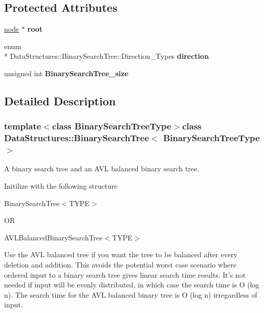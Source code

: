 \subsection*{Protected Attributes}
\begin{DoxyCompactItemize}
\item 
\hypertarget{class_data_structures_1_1_binary_search_tree_a6854050657cfa61442e6189dd0039318}{\hyperlink{struct_data_structures_1_1_binary_search_tree_1_1node}{node} $\ast$ {\bfseries root}}\label{class_data_structures_1_1_binary_search_tree_a6854050657cfa61442e6189dd0039318}

\item 
\hypertarget{class_data_structures_1_1_binary_search_tree_a292e62e2b24b59d393657ff3c69c82ed}{enum \\*
Data\-Structures\-::\-Binary\-Search\-Tree\-::\-Direction\-\_\-\-Types {\bfseries direction}}\label{class_data_structures_1_1_binary_search_tree_a292e62e2b24b59d393657ff3c69c82ed}

\item 
\hypertarget{class_data_structures_1_1_binary_search_tree_a4dfb2e2b9a0a8f23e4fc636b58ea4d3f}{unsigned int {\bfseries Binary\-Search\-Tree\-\_\-size}}\label{class_data_structures_1_1_binary_search_tree_a4dfb2e2b9a0a8f23e4fc636b58ea4d3f}

\end{DoxyCompactItemize}


\subsection{Detailed Description}
\subsubsection*{template$<$class Binary\-Search\-Tree\-Type$>$class Data\-Structures\-::\-Binary\-Search\-Tree$<$ Binary\-Search\-Tree\-Type $>$}

A binary search tree and an A\-V\-L balanced binary search tree. 

Initilize with the following structure

Binary\-Search\-Tree$<$\-T\-Y\-P\-E$>$

O\-R

A\-V\-L\-Balanced\-Binary\-Search\-Tree$<$\-T\-Y\-P\-E$>$

Use the A\-V\-L balanced tree if you want the tree to be balanced after every deletion and addition. This avoids the potential worst case scenario where ordered input to a binary search tree gives linear search time results. It's not needed if input will be evenly distributed, in which case the search time is O (log n). The search time for the A\-V\-L balanced binary tree is O (log n) irregardless of input.

